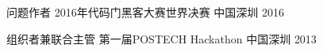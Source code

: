

\begin{cvhonors}

  \cvhonor
    {问题作者} %
    {2016年代码门黑客大赛世界决赛} %
    {中国深圳} %
    {2016} %

  \cvhonor
    {组织者兼联合主管} %
    {第一届POSTECH Hackathon} %
    {中国深圳} %
    {2013} %

\end{cvhonors}
